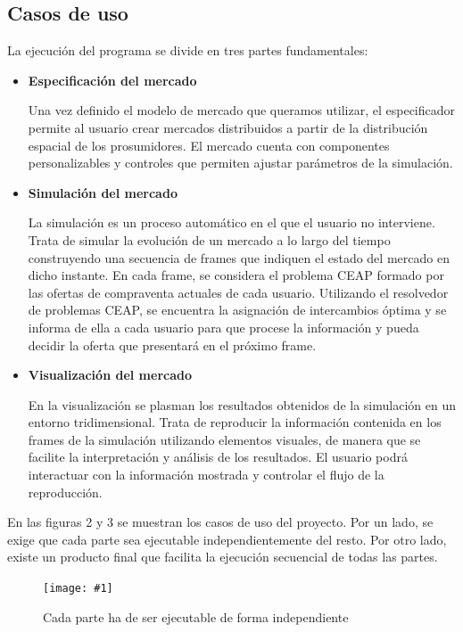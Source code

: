 \documentclass[12pt,a4paper,openright,oneside]{article}
\newcommand{\includeImage}[3]
{
	\begin{figure}[H]
	\begin{center}
	\texttt{[image: \#1]}
	\end{center}
	\caption{#3}
	\end{figure}
}
\numberwithin{equation}{section}
\theoremstyle{definition}
\begin{document}
\subsection{Casos de uso}

La ejecución del programa se divide en tres partes fundamentales:

\begin{itemize}
\item \textbf{Especificación del mercado}

Una vez definido el modelo de mercado que queramos utilizar, el especificador permite al usuario crear mercados distribuidos a partir de la distribución espacial de los prosumidores. El mercado cuenta con componentes personalizables y controles que permiten ajustar parámetros de la simulación.

\item \textbf{Simulación del mercado}

La simulación es un proceso automático en el que el usuario no interviene. Trata de simular la evolución de un mercado a lo largo del tiempo construyendo una secuencia de frames que indiquen el estado del mercado en dicho instante. En cada frame, se considera el problema CEAP formado por las ofertas de compraventa actuales de cada usuario. Utilizando el resolvedor de problemas CEAP, se encuentra la asignación de intercambios óptima y se informa de ella a cada usuario para que procese la información y pueda decidir la oferta que presentará en el próximo frame.

\item \textbf{Visualización del mercado}

En la visualización se plasman los resultados obtenidos de la simulación en un entorno tridimensional. Trata de reproducir la información contenida en los frames de la simulación utilizando elementos visuales, de manera que se facilite la interpretación y análisis de los resultados. El usuario podrá interactuar con la información mostrada y controlar el flujo de la reproducción.

\end{itemize}

En las figuras 2 y 3 se muestran los casos de uso del proyecto. Por un lado, se exige que cada parte sea ejecutable independientemente del resto. Por otro lado, existe un producto final que facilita la ejecución secuencial de todas las partes.

\includeImage{casos_de_uso.png}{10}{ Cada parte ha de ser ejecutable de forma independiente}
\end{document}
